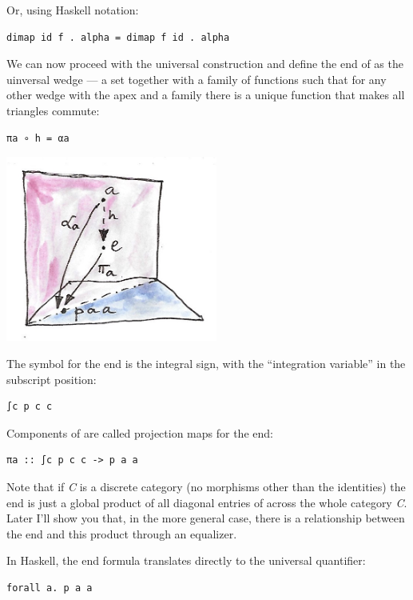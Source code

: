 Or, using Haskell notation:

\begin{verbatim}
dimap id f . alpha = dimap f id . alpha
\end{verbatim}

We can now proceed with the universal construction and define the end of
 as the uinversal wedge --- a set  together with a
family of functions  such that for any other wedge with the
apex  and a family  there is a unique function
 that makes all triangles commute:

\begin{verbatim}
πa ∘ h = αa
\end{verbatim}

\includegraphics[width=2.73958in]{images/end-21.jpg}

The symbol for the end is the integral sign, with the ``integration
variable'' in the subscript position:

\begin{verbatim}
∫c p c c
\end{verbatim}

Components of  are called projection maps for the end:

\begin{verbatim}
πa :: ∫c p c c -> p a a
\end{verbatim}

Note that if \emph{C} is a discrete category (no morphisms other than
the identities) the end is just a global product of all diagonal entries
of  across the whole category \emph{C}. Later I'll show you
that, in the more general case, there is a relationship between the end
and this product through an equalizer.

In Haskell, the end formula translates directly to the universal
quantifier:

\begin{verbatim}
forall a. p a a
\end{verbatim}


